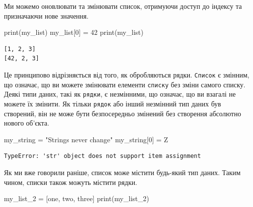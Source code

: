 \documentclass[
  letterpaper,
]{report}
\newenvironment{Shaded}{\begin{snugshade}}{\end{snugshade}}
\newcommand{\BuiltInTok}[1]{\textcolor[rgb]{0.00,0.23,0.31}{#1}}
\newcommand{\DecValTok}[1]{\textcolor[rgb]{0.68,0.00,0.00}{#1}}
\newcommand{\NormalTok}[1]{\textcolor[rgb]{0.00,0.23,0.31}{#1}}
\newcommand{\OperatorTok}[1]{\textcolor[rgb]{0.37,0.37,0.37}{#1}}
\newcommand{\StringTok}[1]{\textcolor[rgb]{0.13,0.47,0.30}{#1}}
\begin{document}
Ми можемо оновлювати та змінювати список, отримуючи доступ до індексу та
призначаючи нове значення.

\begin{Shaded}
\begin{Highlighting}[]
\BuiltInTok{print}\NormalTok{(my\_list)}
\NormalTok{my\_list[}\DecValTok{0}\NormalTok{] }\OperatorTok{=} \DecValTok{42}
\BuiltInTok{print}\NormalTok{(my\_list)}
\end{Highlighting}
\end{Shaded}

\begin{verbatim}
[1, 2, 3]
[42, 2, 3]
\end{verbatim}

Це принципово відрізняється від того, як обробляються рядки.
\texttt{Список} є змінним, що означає, що ви можете змінювати елементи
\texttt{списку} без зміни самого списку. Деякі типи даних, такі як
\texttt{рядки}, є незмінними, що означає, що ви взагалі не можете їх
змінити. Як тільки \texttt{рядок} або інший незмінний тип даних був
створений, він не може бути безпосередньо змінений без створення
абсолютно нового об'єкта.

\begin{Shaded}
\begin{Highlighting}[]
\NormalTok{my\_string }\OperatorTok{=} \StringTok{"Strings never change"}
\NormalTok{my\_string[}\DecValTok{0}\NormalTok{] }\OperatorTok{=} \StringTok{\textquotesingle{}Z\textquotesingle{}}
\end{Highlighting}
\end{Shaded}

\begin{verbatim}
TypeError: 'str' object does not support item assignment
\end{verbatim}

Як ми вже говорили раніше, список може містити будь-який тип даних.
Таким чином, списки також можуть містити рядки.

\begin{Shaded}
\begin{Highlighting}[]
\NormalTok{my\_list\_2 }\OperatorTok{=}\NormalTok{ [}\StringTok{\textquotesingle{}one\textquotesingle{}}\NormalTok{, }\StringTok{\textquotesingle{}two\textquotesingle{}}\NormalTok{, }\StringTok{\textquotesingle{}three\textquotesingle{}}\NormalTok{]}
\BuiltInTok{print}\NormalTok{(my\_list\_2)}
\end{Highlighting}
\end{Shaded}
\end{document}
